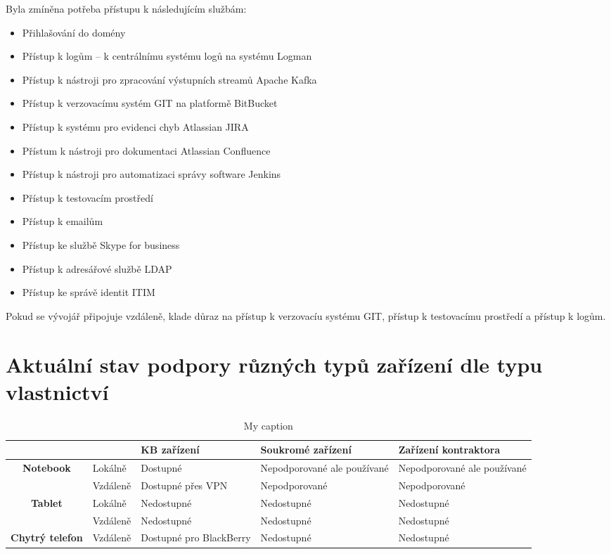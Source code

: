 Byla zmíněna potřeba přístupu k následujícím službám:
\begin{itemize}
    \item Přihlašování do domény
    \item Přístup k logům -- k centrálnímu systému logů na systému Logman
    \item Přístup k nástroji pro zpracování výstupních streamů Apache Kafka
    \item Přístup k verzovacímu systém GIT na platformě BitBucket
    \item Přístup k systému pro evidenci chyb Atlassian JIRA
    \item Přístum k nástroji pro dokumentaci Atlassian Confluence
    \item Přístup k nástroji pro automatizaci správy software Jenkins
    \item Přístup k testovacím prostředí
    \item Přístup k emailům 
    \item Přístup ke službě Skype for business
    \item Přístup k adresářové službě LDAP
    \item Přístup ke správě identit ITIM
\end{itemize}

Pokud se vývojář připojuje vzdáleně, klade důraz na přístup k verzovacíu systému GIT, přístup k testovacímu prostředí a přístup k logům.

\section{Aktuální stav podpory různých typů zařízení dle typu vlastnictví}
\begin{table}[]
\centering
\caption{My caption}
\label{my-label}
\begin{tabular}{c|l|l|l|l}
                          &          &\textbf{ KB zařízení }            & \textbf{Soukromé zařízení}           & \textbf{Zařízení kontraktora}                             \\ \hline
\multirow{2}{*}{\textbf{Notebook}} & Lokálně  & Dostupné                & Nepodporované ale používané & \multicolumn{1}{l|}{Nepodporované ale používané} \\ \cline{2-5} 
                          & Vzdáleně & Dostupné přes VPN       & Nepodporované               & \multicolumn{1}{l|}{Nepodporované}               \\ \hline
\multirow{2}{*}{\textbf{Tablet}}   & Lokálně  & Nedostupné              & Nedostupné                  & \multicolumn{1}{l|}{Nedostupné}                  \\ \cline{2-5} 
                          & Vzdáleně & Nedostupné              & Nedostupné                  & \multicolumn{1}{l|}{Nedostupné}                  \\ \hline
\textbf{Chytrý telefon}            & Vzdáleně & Dostupné pro BlackBerry & Nedostupné                  & \multicolumn{1}{l|}{Nedostupné}                  \\ \cline{1-1}
\end{tabular}
\end{table}

